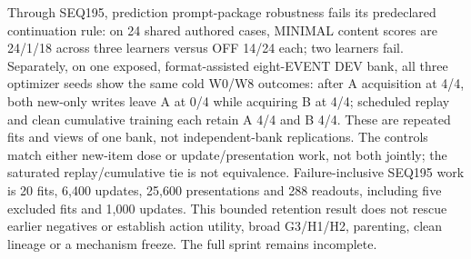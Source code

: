 \documentclass{article}
\begin{document}
Through SEQ195, prediction prompt-package robustness fails its predeclared
continuation rule: on 24 shared authored cases, MINIMAL content scores are
24/1/18 across three learners versus OFF 14/24 each; two learners fail.
Separately, on one exposed, format-assisted eight-EVENT DEV bank, all three
optimizer seeds show the same cold W0/W8 outcomes: after A acquisition at 4/4,
both new-only writes leave A at 0/4 while acquiring B at 4/4; scheduled replay
and clean cumulative training each retain A 4/4 and B 4/4. These are repeated
fits and views of one bank, not independent-bank replications. The controls
match either new-item dose or update/presentation work, not both jointly;
the saturated replay/cumulative tie is not equivalence. Failure-inclusive
SEQ195 work is 20 fits, 6,400 updates, 25,600 presentations and 288 readouts,
including five excluded fits and 1,000 updates. This bounded retention result
does not rescue earlier negatives or establish action utility, broad G3/H1/H2,
parenting, clean lineage or a mechanism freeze. The full sprint remains incomplete.
\end{document}
